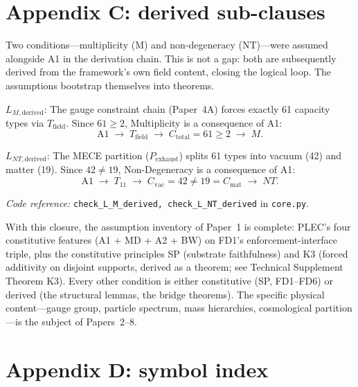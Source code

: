 \documentclass[11pt]{article}
\theoremstyle{remark}
\newcommand{\coderef}[2]{\smallskip\noindent\textit{Code reference:} \texttt{#1} in \texttt{#2}.}
\begin{document}
\section{Appendix C: derived sub-clauses}
\label{app:derived}

Two conditions---multiplicity (M) and non-degeneracy (NT)---were assumed alongside A1 in the derivation chain.  This is not a gap: both are subsequently derived from the framework's own field content, closing the logical loop.  The assumptions bootstrap themselves into theorems.

\begin{tcolorbox}[apfbox, title={$L_{M,\mathrm{derived}}$ (Multiplicity Derived) and $L_{NT,\mathrm{derived}}$ (Non-Degeneracy Derived)}]
\textbf{\textit{$L_{M,\mathrm{derived}}$}}: The gauge constraint chain (Paper~4A) forces exactly 61 capacity types via $T_{\mathrm{field}}$.  Since $61 \ge 2$, Multiplicity is a consequence of A1:
\[
\text{A1} \;\to\; T_{\mathrm{field}} \;\to\; C_{\mathrm{total}} = 61 \ge 2 \;\to\; M.
\]

\textbf{\textit{$L_{NT,\mathrm{derived}}$}}: The MECE partition ($P_{\mathrm{exhaust}}$) splits 61 types into vacuum (42) and matter (19).  Since $42 \ne 19$, Non-Degeneracy is a consequence of A1:
\[
\text{A1} \;\to\; T_{11} \;\to\; C_{\mathrm{vac}} = 42 \ne 19 = C_{\mathrm{mat}} \;\to\; NT.
\]

\coderef{check\_L\_M\_derived, check\_L\_NT\_derived}{core.py}
\end{tcolorbox}

\smallskip\noindent With this closure, the assumption inventory of Paper~1 is complete: PLEC's four constitutive features (A1 + MD + A2 + BW) on FD1's enforcement-interface triple, plus the constitutive principles SP (substrate faithfulness) and K3 (forced additivity on disjoint supports, derived as a theorem; see Technical Supplement Theorem K3).  Every other condition is either constitutive (SP, FD1--FD6) or derived (the structural lemmas, the bridge theorems).  The specific physical content---gauge group, particle spectrum, mass hierarchies, cosmological partition---is the subject of Papers~2--8.

\section{Appendix D: symbol index}
\end{document}
